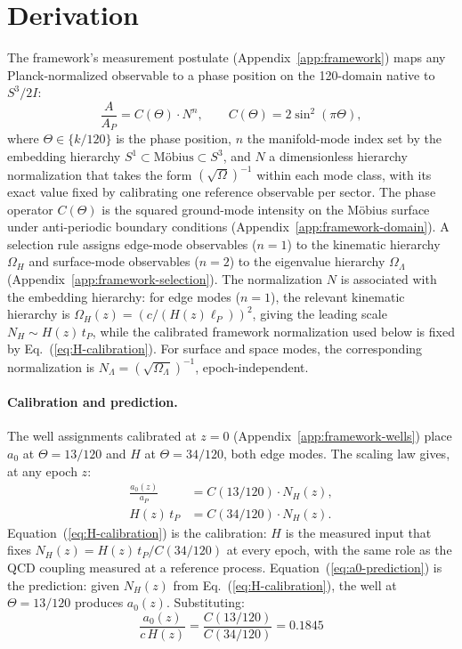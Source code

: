 \documentclass[
    aps,
    prd,
    reprint,
    superscriptaddress,
    nofootinbib,
    floatfix
]{revtex4-2}
\begin{document}
\section{Derivation}
\label{sec:derivation}

The framework's measurement postulate (Appendix~\ref{app:framework})
maps any Planck-normalized observable to a phase position on the
120-domain native to $S^3/2I$:
\begin{equation}
\frac{A}{A_P} = C(\Theta) \cdot N^n,
\qquad C(\Theta) = 2\sin^2(\pi\Theta),
\label{eq:scaling-law}
\end{equation}
where $\Theta \in \{k/120\}$ is the phase position, $n$ the
manifold-mode index set by the embedding hierarchy
$S^1 \subset \text{M\"obius} \subset S^3$, and $N$ a dimensionless
hierarchy normalization that takes the form $(\sqrt{\Omega})^{-1}$
within each mode class, with its exact value fixed by calibrating one
reference observable per sector. The phase operator $C(\Theta)$ is
the squared ground-mode intensity on the M\"obius surface under
anti-periodic boundary conditions
(Appendix~\ref{app:framework-domain}). A selection rule assigns
edge-mode observables ($n = 1$) to the kinematic hierarchy $\Omega_H$
and surface-mode observables ($n = 2$) to the eigenvalue hierarchy
$\Omega_\Lambda$ (Appendix~\ref{app:framework-selection}). The
normalization $N$ is associated with the embedding hierarchy: for edge
modes ($n = 1$), the relevant kinematic hierarchy is
$\Omega_H(z) = (c/(H(z)\ell_P))^2$, giving the leading scale
$N_H \sim H(z)\,t_P$, while the calibrated framework normalization
used below is fixed by Eq.~(\ref{eq:H-calibration}). For surface and
space modes, the corresponding normalization is
$N_\Lambda = (\sqrt{\Omega_\Lambda})^{-1}$, epoch-independent.

\paragraph*{Calibration and prediction.}
The well assignments calibrated at $z = 0$
(Appendix~\ref{app:framework-wells}) place $a_0$ at $\Theta = 13/120$
and $H$ at $\Theta = 34/120$, both edge modes. The scaling law gives,
at any epoch $z$:
\begin{align}
\frac{a_0(z)}{a_P} &= C(13/120) \cdot N_H(z),
\label{eq:a0-prediction} \\
H(z)\,t_P &= C(34/120) \cdot N_H(z).
\label{eq:H-calibration}
\end{align}
Equation~(\ref{eq:H-calibration}) is the calibration: $H$ is the
measured input that fixes $N_H(z) = H(z)\,t_P/C(34/120)$ at every
epoch, with the same role as the QCD coupling measured at a reference
process. Equation~(\ref{eq:a0-prediction}) is the prediction: given
$N_H(z)$ from Eq.~(\ref{eq:H-calibration}), the well at
$\Theta = 13/120$ produces $a_0(z)$. Substituting:
\begin{equation}
\boxed{\;\frac{a_0(z)}{c\,H(z)}
       = \frac{C(13/120)}{C(34/120)} = 0.1845\;}
\label{eq:milgrom-boxed}
\end{equation}
\end{document}
